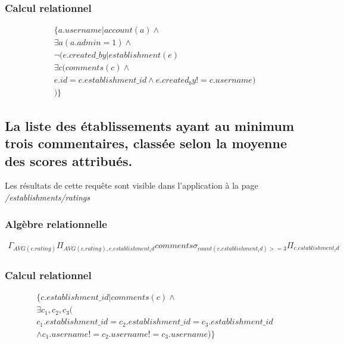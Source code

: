 \documentclass[a4paper,10pt]{article}
\begin{document}
\subsubsection{Calcul relationnel}
\begin{align}
    \{ a.username | account(a) \wedge \\
    \exists a(a.admin=1) \wedge \\
    \neg (e.created\_by | establishment(e) \\
        \exists c(comments(c) \wedge \\
        e.id=c.establishment\_id \wedge e.created_by!=c.username) \\
    ) \}
\end{align}


\subsection{La liste des établissements ayant au minimum trois commentaires,
classée selon la moyenne des scores attribués.}
    Les résultats de cette requête sont visible dans l'application à la page
    \emph{/establishments/ratings}
    

\subsubsection{Algèbre relationnelle}
\begin{align}
    \Gamma_{AVG(c.rating)}\Pi_{AVG(c.rating), c.establishment_id}comments \sigma_{count(c.establishment_id)>=3}\Pi_{c.establishment_id}
\end{align}

\subsubsection{Calcul relationnel}
\begin{align}
    \{ c.establishment\_id | comments(c) \wedge \\
    \exists c_1, c_2, c_3 ( \\
        c_1.establishment\_id = c_2.establishment\_id = c_3.establishment\_id \\
        \wedge c_1.username != c_2.username != c_3.username
    ) \}
\end{align}

\end{document}
